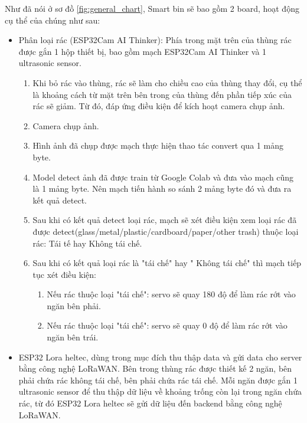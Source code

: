 Như đã nói ở sơ đồ \ref{fig:general_chart}, Smart bin sẽ bao gồm 2 board, hoạt động cụ thể của chúng như sau:
\begin{itemize}
    \item Phân loại rác (ESP32Cam AI Thinker): Phía trong mặt trên của thùng rác được gắn 1 hộp thiết bị, bao gồm mạch ESP32Cam AI Thinker và 1 ultrasonic sensor.
    \begin{enumerate}
        \item Khi bỏ rác vào thùng, rác sẽ làm cho chiều cao của thùng thay đổi, cụ thể là khoảng cách từ mặt trên bên trong của thùng đến phần tiếp xúc của rác sẽ giảm. Từ đó, đáp ứng điều kiện để kích hoạt camera chụp ảnh.
        \item Camera chụp ảnh.
        \item Hình ảnh đã chụp được mạch thực hiện thao tác convert qua 1 mảng byte.
        \item Model detect ảnh đã được train từ Google Colab và đưa vào mạch cũng là 1 mảng byte. Nên mạch tiến hành so sánh 2 mảng byte đó và đưa ra kết quả detect.
        \item Sau khi có kết quả detect loại rác, mạch sẽ xét điều kiện xem loại rác đã được detect(glass/metal/plastic/cardboard/paper/other trash) thuộc loại rác: Tái tế hay Không tái chế.
        \item Sau khi có kết quả loại rác là "tái chế" hay " Không tái chế" thì mạch tiếp tục xét điều kiện:
        \begin{enumerate}
            \item Nếu rác thuộc loại "tái chế": servo sẽ quay 180 độ để làm rác rớt vào ngăn bên phải.
            \item Nếu rác thuộc loại "tái chế": servo sẽ quay 0 độ để làm rác rớt vào ngăn bên trái.
        \end{enumerate} 
    \end{enumerate}
    \item ESP32 Lora heltec, dùng trong mục đích thu thập data và gửi data cho server bằng công nghệ LoRaWAN. Bên trong thùng rác được thiết kế 2 ngăn, bên phải chứa rác không tái chế, bên phải chứa rác tái chế. Mỗi ngăn được gắn 1 ultrasonic sensor để thu thập dữ liệu về khoảng trống còn lại trong ngăn chứa rác, từ đó ESP32 Lora heltec sẽ gửi dữ liệu đến backend bằng công nghệ LoRaWAN.
\end{itemize}

